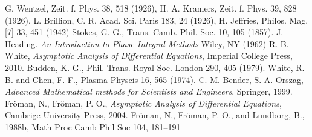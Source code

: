 \documentclass[aps,prl,preprint,superscriptaddress]{revtex4}
\begin{document}
\begin{thebibliography}{10}
 G. Wentzel, Zeit. f. Phys. 38, 518 (1926), H. A. Kramers,
 Zeit. f. Phys. 39, 828 (1926), L. Brillion, C. R. Acad. Sci. Paris 183, 
24 (1926), H. Jeffries, Philos. Mag. [7] 33, 451 (1942)
 Stokes, G. G., Trans. Camb. Phil. Soc. 10, 105 (1857).
 J. Heading. {\it An Introduction to Phase Integral Methods} 
Wiley, NY (1962)
 R. B. White,
 {\it Asymptotic Analysis of Differential Equations}, Imperial College Press, 2010.
 Budden, K. G., Phil. Trans. Royal Soc. London 290, 405 (1979).
 White, R. B. and Chen, F. F., Plasma Physcis 16, 565 (1974).
 C. M. Bender, S. A. Orszag,
 {\it Advanced Mathematical methods for Scientists and Engineers}, Springer, 1999.
 Fr\"oman, N., Fr\"oman, P. O.,
 {\it Asymptotic Analysis of Differential Equations}, Cambrige University Press, 2004. 
 Fr\"oman, N., Fr\"oman, P. O., and Lundborg, B., 1988b, Math Proc Camb Phil Soc 104, 181–191
\end{thebibliography}
\end{document}
